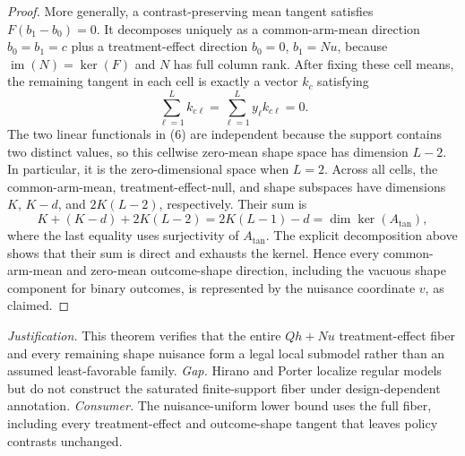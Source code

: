\documentclass{article}
\begin{document}
\begin{proof}
More generally, a contrast-preserving mean tangent satisfies \(F(b_1-b_0)=0\). It decomposes uniquely as a common-arm-mean direction \(b_0=b_1=c\) plus a treatment-effect direction \(b_0=0\), \(b_1=Nu\), because \(\operatorname{im}(N)=\ker(F)\) and \(N\) has full column rank. After fixing these cell means, the remaining tangent in each cell is exactly a vector \(k_c\) satisfying
\[
\sum_{\ell=1}^L k_{c\ell}=\sum_{\ell=1}^L y_\ell k_{c\ell}=0.
\tag{6}
\]
The two linear functionals in (6) are independent because the support contains two distinct values, so this cellwise zero-mean shape space has dimension \(L-2\). In particular, it is the zero-dimensional space when \(L=2\). Across all cells, the common-arm-mean, treatment-effect-null, and shape subspaces have dimensions \(K\), \(K-d\), and \(2K(L-2)\), respectively. Their sum is
\[
K+(K-d)+2K(L-2)=2K(L-1)-d=\dim\ker(A_{\mathrm{tan}}),
\]
where the last equality uses surjectivity of \(A_{\mathrm{tan}}\). The explicit decomposition above shows that their sum is direct and exhausts the kernel. Hence every common-arm-mean and zero-mean outcome-shape direction, including the vacuous shape component for binary outcomes, is represented by the nuisance coordinate \(v\), as claimed.
\end{proof}
\par\smallskip\noindent \textit{Justification.} This theorem verifies that the entire \(Qh+Nu\) treatment-effect fiber and every remaining shape nuisance form a legal local submodel rather than an assumed least-favorable family. \textit{Gap.} Hirano and Porter localize regular models but do not construct the saturated finite-support fiber under design-dependent annotation. \textit{Consumer.} The nuisance-uniform lower bound uses the full fiber, including every treatment-effect and outcome-shape tangent that leaves policy contrasts unchanged.
\end{document}
